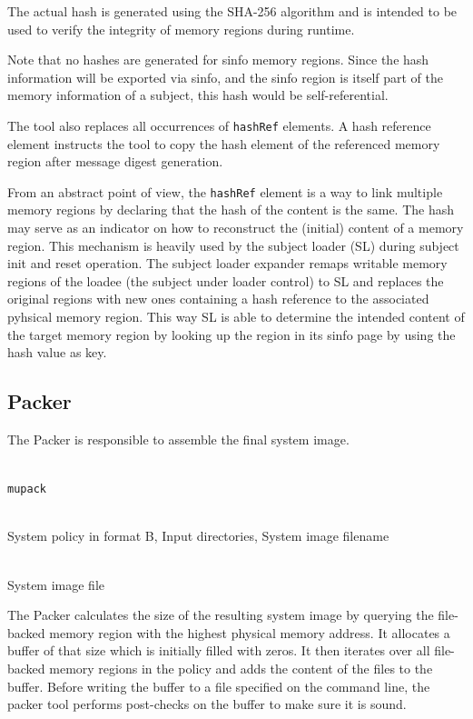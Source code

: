 \documentclass[a4paper,twoside,titlepage]{article}
\begin{document}
The actual hash is generated using the SHA-256 algorithm and is intended to be
used to verify the integrity of memory regions during runtime.

Note that no hashes are generated for sinfo memory regions. Since the
hash information will be exported via sinfo, and the sinfo region is
itself part of the memory information of a subject, this hash would be
self-referential.

The tool also replaces all occurrences of \texttt{hashRef} elements. A hash
reference element instructs the tool to copy the hash element of the referenced
memory region after message digest generation.

From an abstract point of view, the \texttt{hashRef} element is a way to link
multiple memory regions by declaring that the hash of the content is the same.
The hash may serve as an indicator on how to reconstruct the (initial) content
of a memory region. This mechanism is heavily used by the subject loader (SL)
during subject init and reset operation. The subject loader expander remaps
writable memory regions of the loadee (the subject under loader control) to SL
and replaces the original regions with new ones containing a hash reference to
the associated pyhsical memory region. This way SL is able to determine the
intended content of the target memory region by looking up the region in its
sinfo page by using the hash value as key.

\subsection{Packer}
\label{sec:tools-packer}
The Packer is responsible to assemble the final system image.

\begin{description} \itemsep1pt \parskip0pt
	\item[Name] \hfill \\
		\texttt{mupack}
	\item[Input] \hfill \\
		System policy in format B, Input directories, System image filename
	\item[Output] \hfill \\
		System image file
\end{description}

The Packer calculates the size of the resulting system image by querying the
file-backed memory region with the highest physical memory address. It
allocates a buffer of that size which is initially filled with zeros. It then
iterates over all file-backed memory regions in the policy and adds the content
of the files to the buffer. Before writing the buffer to a file specified on
the command line, the packer tool performs post-checks on the buffer to make
sure it is sound.
\end{document}
